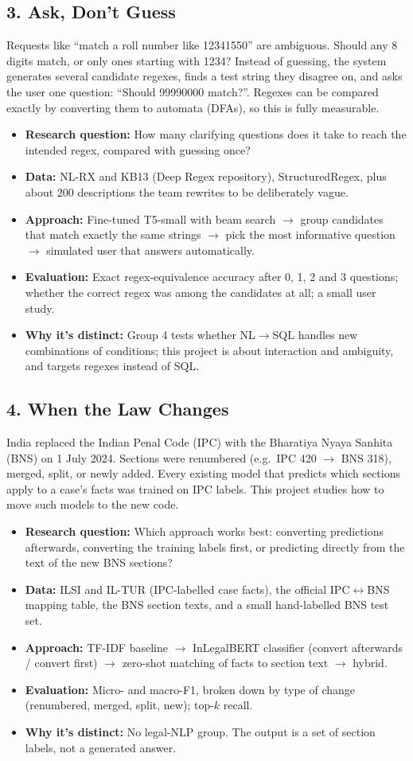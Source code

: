 \documentclass[11pt,a4paper]{article}
\newcommand{\project}[7]{%
  \needspace{14\baselineskip}
  \subsection{#1}
  #2
  \begin{itemize}
    \item \textbf{Research question:} #3
    \item \textbf{Data:} #4
    \item \textbf{Approach:} #5
    \item \textbf{Evaluation:} #6
    \item \textbf{Why it's distinct:} #7
  \end{itemize}}
\begin{document}
\project{3. Ask, Don't Guess}
  {Requests like ``match a roll number like 12341550'' are ambiguous. Should any 8 digits match, or
   only ones starting with 1234? Instead of guessing, the system generates several candidate regexes,
   finds a test string they disagree on, and asks the user one question: ``Should 99990000 match?''.
   Regexes can be compared exactly by converting them to automata (DFAs), so this is fully measurable.}
  {How many clarifying questions does it take to reach the intended regex, compared with guessing once?}
  {NL-RX and KB13 (Deep Regex repository), StructuredRegex, plus about 200 descriptions the team
   rewrites to be deliberately vague.}
  {Fine-tuned T5-small with beam search $\to$ group candidates that match exactly the same strings
   $\to$ pick the most informative question $\to$ simulated user that answers automatically.}
  {Exact regex-equivalence accuracy after 0, 1, 2 and 3 questions; whether the correct regex was
   among the candidates at all; a small user study.}
  {Group 4 tests whether NL$\to$SQL handles new combinations of conditions; this project is about
   interaction and ambiguity, and targets regexes instead of SQL.}

\project{4. When the Law Changes}
  {India replaced the Indian Penal Code (IPC) with the Bharatiya Nyaya Sanhita (BNS) on 1 July 2024.
   Sections were renumbered (e.g.\ IPC 420 $\to$ BNS 318), merged, split, or newly added. Every
   existing model that predicts which sections apply to a case's facts was trained on IPC labels.
   This project studies how to move such models to the new code.}
  {Which approach works best: converting predictions afterwards, converting the training labels
   first, or predicting directly from the text of the new BNS sections?}
  {ILSI and IL-TUR (IPC-labelled case facts), the official IPC$\leftrightarrow$BNS mapping table,
   the BNS section texts, and a small hand-labelled BNS test set.}
  {TF-IDF baseline $\to$ InLegalBERT classifier (convert afterwards / convert first) $\to$ zero-shot
   matching of facts to section text $\to$ hybrid.}
  {Micro- and macro-F1, broken down by type of change (renumbered, merged, split, new); top-$k$ recall.}
  {No legal-NLP group. The output is a set of section labels, not a generated answer.}
\end{document}
